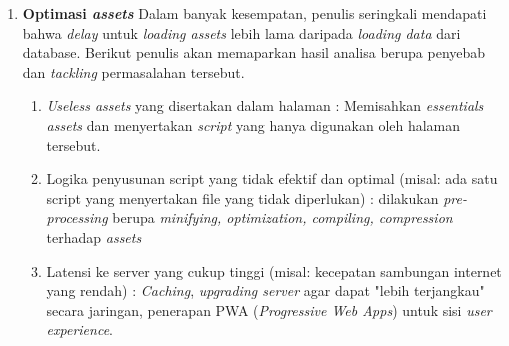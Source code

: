 \begin{enumerate}
		\item \textbf{Optimasi \textit{assets}} \newline
		\indent Dalam banyak kesempatan, penulis seringkali mendapati bahwa \textit{delay} untuk \textit{loading assets} lebih lama daripada \textit{loading data} dari database. Berikut penulis akan memaparkan hasil analisa berupa penyebab dan \textit{tackling} permasalahan tersebut.
			\begin{enumerate}
				\item \textit{Useless assets} yang disertakan dalam halaman : Memisahkan \textit{essentials assets} dan menyertakan \textit{script} yang hanya digunakan oleh halaman tersebut.
				\item Logika penyusunan script yang tidak efektif dan optimal (misal: ada satu script yang menyertakan file yang tidak diperlukan) : dilakukan \textit{pre-processing} berupa \textit{minifying, optimization, compiling, compression} terhadap \textit{assets}
				\item Latensi ke server yang cukup tinggi (misal: kecepatan sambungan internet yang rendah) : \textit{Caching}, \textit{upgrading server} agar dapat "lebih terjangkau" secara jaringan, penerapan PWA (\textit{Progressive Web Apps}) untuk sisi \textit{user experience}.
			\end{enumerate}
	\end{enumerate}